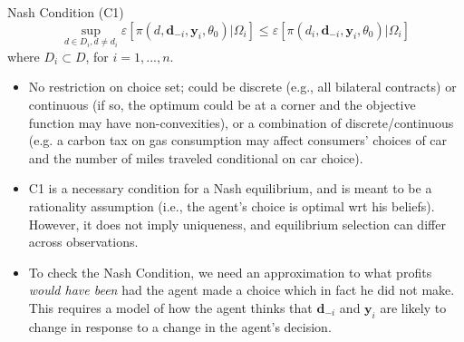 \documentclass[xcolor=pdftex,dvipsnames,table,mathserif]{beamer}
\begin{document}
\begin{frame}{Nash Condition (C1)}
\begin{equation*}
\sup_{d\in D_{i},d\neq d_{i}}\varepsilon\left[ \pi (d,\mathbf{d}_{-i},\mathbf{y}_{i},\theta _{0})|\Omega_i \right] \leq \varepsilon\left[ \pi (d_{i},\mathbf{d}_{-i},\mathbf{y}_{i},\theta _{0})| \Omega_i \right] 
\end{equation*}
where $D_{i}\subset D$, for $i=1,...,n$.
\begin{itemize}
\footnotesize
\item No restriction on choice set; could be discrete (e.g., all bilateral
contracts) or continuous (if so, the optimum could be at a corner and the objective function may
have non-convexities), or a combination of discrete/continuous (e.g. a carbon tax on gas consumption may affect consumers' choices of car and the number of miles
traveled conditional on car choice).
\item C1 is a necessary condition for a Nash equilibrium, and is meant to be a rationality assumption (i.e., the agent's choice is optimal wrt his beliefs).  However, it does not imply uniqueness, and equilibrium selection can differ across observations.
\item To check the Nash Condition, we need an approximation to what profits \textit{%
would have been} had the agent made a choice which in fact he did not make.
This requires a model of how the agent thinks that $\mathbf{d}_{-i}$ and $%
\mathbf{y}_{i}$ are likely to change in response to a change in the agent's
decision. 
\end{itemize}
\end{frame}
\end{document}

